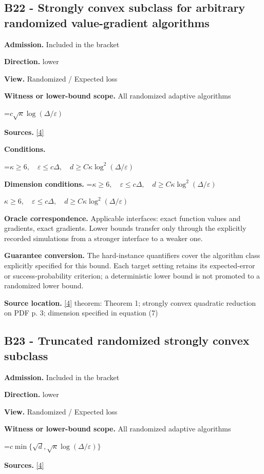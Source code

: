 \documentclass[10pt,a4paper]{article}
\newcommand{\AtlasMath}[1]{\par\begingroup\centering\setbox0=\hbox{$\displaystyle #1$}\ifdim\wd0>1.4\linewidth\typeout{ATLAS WIDE FORMULA: \the\wd0}\fi\ifdim\wd0>\linewidth\resizebox{\linewidth}{!}{\box0}\else\box0\fi\par\endgroup}
\newcommand{\AtlasInlineMath}[1]{\begingroup\setbox0=\hbox{$#1$}\ifdim\wd0>.4\linewidth\endgroup\AtlasMath{#1}\else\endgroup$#1$\fi}
\begin{document}
\subsection{B22 - Strongly convex subclass for arbitrary randomized value-gradient algorithms}
\textbf{Admission.} Included in the bracket

\textbf{Direction.} lower

\textbf{View.} Randomized / Expected loss

\textbf{Witness or lower-bound scope.} All randomized adaptive algorithms

\AtlasMath{c\sqrt\kappa\log(\Delta/\varepsilon)}
\textbf{Sources.} \href{https://arxiv.org/pdf/2609.10874}{[4]}

\textbf{Conditions.} 
\AtlasMath{\kappa\ge6,\quad\varepsilon\le c\Delta,\quad d\ge C\kappa\log^2(\Delta/\varepsilon)}


\textbf{Dimension conditions.} \AtlasInlineMath{\kappa\ge6,\quad\varepsilon\le c\Delta,\quad d\ge C\kappa\log^2(\Delta/\varepsilon)}

\textbf{Oracle correspondence.} Applicable interfaces: exact function values and gradients, exact gradients. Lower bounds transfer only through the explicitly recorded simulations from a stronger interface to a weaker one.

\textbf{Guarantee conversion.} The hard-instance quantifiers cover the algorithm class explicitly specified for this bound. Each target setting retains its expected-error or success-probability criterion; a deterministic lower bound is not promoted to a randomized lower bound.

\textbf{Source location.} \href{https://arxiv.org/pdf/2609.10874}{[4]} theorem: Theorem 1; strongly convex quadratic reduction on PDF p. 3; dimension specified in equation (7)

\subsection{B23 - Truncated randomized strongly convex subclass}
\textbf{Admission.} Included in the bracket

\textbf{Direction.} lower

\textbf{View.} Randomized / Expected loss

\textbf{Witness or lower-bound scope.} All randomized adaptive algorithms

\AtlasMath{c\min\{\sqrt d,\sqrt\kappa\log(\Delta/\varepsilon)\}}
\textbf{Sources.} \href{https://arxiv.org/pdf/2609.10874}{[4]}
\end{document}
